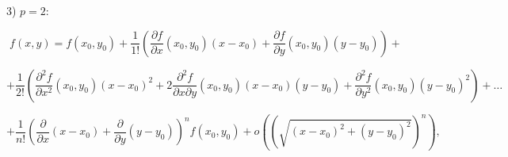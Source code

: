{3) \( p = 2 \):



\[
f(x,y) = f(x_0, y_0) + \frac{1}{1!} \left( \frac{\partial f}{\partial x} (x_0, y_0) (x - x_0) + \frac{\partial f}{\partial y} (x_0, y_0) (y - y_0) \right) +
\]





\[
+ \frac{1}{2!} \left( \frac{\partial^2 f}{\partial x^2} (x_0, y_0) (x - x_0)^2 + 2 \frac{\partial^2 f}{\partial x \partial y} (x_0, y_0) (x - x_0)(y - y_0) + \frac{\partial^2 f}{\partial y^2} (x_0, y_0) (y - y_0)^2 \right) + \ldots
\]





\[
+ \frac{1}{n!} \left( \frac{\partial}{\partial x} (x - x_0) + \frac{\partial}{\partial y} (y - y_0) \right)^n f(x_0, y_0) + o \left( \left( \sqrt{(x - x_0)^2 + (y - y_0)^2} \right)^n \right),
\]




}